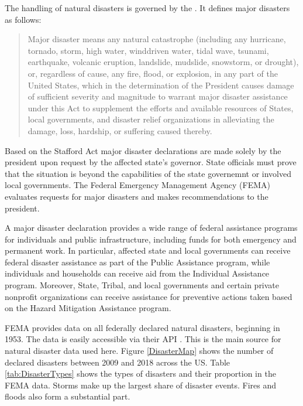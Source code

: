 The handling of natural disasters is governed by the \cite{Stafford}. It defines major disasters as follows:
\begin{quote}
	 Major disaster means any natural catastrophe (including any 	hurricane, tornado, storm, high water, winddriven water, tidal wave, tsunami, earthquake, volcanic eruption, landslide, mudslide, snowstorm, or drought), or, regardless of cause, any fire, flood, or explosion, in any part of the United States, which in the determination of the President causes damage of sufficient severity and magnitude to warrant major disaster assistance under this Act to supplement the efforts and available resources of States, local governments, and disaster relief organizations in alleviating the damage, loss, hardship, or suffering caused thereby.
\end{quote}
Based on the Stafford Act major disaster declarations are made solely by the president upon request by the affected state's governor. State officials must prove that the situation is beyond the capabilities of the state governemnt or involved local governments. The Federal Emergency Management Agency (FEMA) evaluates requests for major disasters and makes recommendations to the president.

A major disaster declaration provides a wide range of federal assistance programs for individuals and public infrastructure, including funds for both emergency and permanent work. In particular, affected state and local governments can receive federal disaster assistance as part of the Public Assistance program, while individuals and households can receive aid from the Individual Assistance program. Moreover, State, Tribal, and local governments and certain private nonprofit organizations can receive assistance for preventive actions taken based on the Hazard Mitigation Assistance program.

FEMA provides data on all federally declared natural disasters, beginning in 1953. The data is easily accessible via their API \citep{rfema}. This is the main source for natural disaster data used here. Figure \ref{DisasterMap} shows the number of declared disasters between 2009 and 2018 across the US. Table \ref{tab:DisasterTypes} shows the types of disasters and their proportion in the FEMA data. Storms make up the largest share of disaster events. Fires and floods also form a substantial part.

